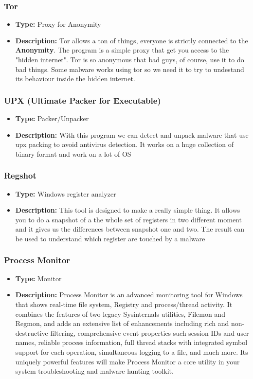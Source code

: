 \documentclass[]{beamer}
\begin{document}
		\begin{frame}
			\frametitle{Tor}
				\begin{itemize}
					\item{\textbf{Type:} Proxy for Anonymity}
					\item{\textbf{Description:} Tor allows a ton of things, everyone is strictly connected to the \textbf{Anonymity}. The program is a simple proxy that get you access to the "hidden internet". Tor is so anonymous that bad guys, of course, use it to do bad things. Some malware works using tor so we need it to try to undestand its behaviour inside the hidden internet.}
				\end{itemize}
		\end{frame}
		\begin{frame}
			\frametitle{UPX (Ultimate Packer for Executable)}
				\begin{itemize}
					\item{\textbf{Type:} Packer/Unpacker}
					\item{\textbf{Description:} With this program we can detect and unpack malware that use upx packing to avoid antivirus detection. It works on a huge collection of binary format and work on a lot of OS } 
				\end{itemize}
		\end{frame}
		\begin{frame}
			\frametitle{Regshot}
				\begin{itemize}
					\item{\textbf{Type:} Windows register analyzer}
					\item{\textbf{Description:} This tool is designed to make a really simple thing. It allows you to do a snapshot of a the whole set of registers in two different moment and it gives us the differences between snapshot one and two. The result can be used to understand which register are touched by a malware}
				\end{itemize}
		\end{frame}
		\begin{frame}
			\frametitle{Process Monitor}
				\begin{itemize}
					\item{\textbf{Type:} Monitor }
					\item{\textbf{Description:} Process Monitor is an advanced monitoring tool for Windows that shows real-time file system, Registry and process/thread activity. It combines the features of two legacy Sysinternals utilities, Filemon and Regmon, and adds an extensive list of enhancements including rich and non-destructive filtering, comprehensive event properties such session IDs and user names, reliable process information, full thread stacks with integrated symbol support for each operation, simultaneous logging to a file, and much more. Its uniquely powerful features will make Process Monitor a core utility in your system troubleshooting and malware hunting toolkit.}
				\end{itemize}
		\end{frame}
\end{document}
